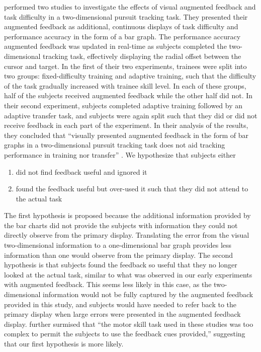 \citeauthor{doi:10.1177/107118137802200127} performed two studies to investigate the effects of visual augmented feedback and task difficulty in a two-dimensional pursuit tracking task.
They presented their augmented feedback as additional, continuous displays of task difficulty and performance accuracy in the form of a bar graph.
The performance accuracy augmented feedback was updated in real-time as subjects completed the two-dimensional tracking task, effectively displaying the radial offset between the cursor and target.
In the first of their two experiments, trainees were split into two groups: fixed-difficulty training and adaptive training, such that the difficulty of the task gradually increased with trainee skill level.
In each of these groups, half of the subjects received augmented feedback while the other half did not.
In their second experiment, subjects completed adaptive training followed by an adaptive transfer task, and subjects were again split such that they did or did not receive feedback in each part of the experiment.
In their analysis of the results, they concluded that ``visually presented augmented feedback in the form of bar graphs in a two-dimensional pursuit tracking task does not aid tracking performance in training nor transfer'' \citep{doi:10.1177/107118137802200127}.
We hypothesize that subjects either
\begin{enumerate}
    \item did not find feedback useful and ignored it
    \item found the feedback useful but over-used it such that they did not attend to the actual task
\end{enumerate}
The first hypothesis is proposed because the additional information provided by the bar charts did not provide the subjects with information they could not directly observe from the primary display.
Translating the error from the visual two-dimensional information to a one-dimensional bar graph provides less information than one would observe from the primary display.
The second hypothesis is that subjects found the feedback so useful that they no longer looked at the actual task, similar to what was observed in our early experiments with augmented feedback.
This seems less likely in this case, as the two-dimensional information would not be fully captured by the augmented feedback provided in this study, and subjects would have needed to refer back to the primary display when large errors were presented in the augmented feedback display.
\citeauthor{doi:10.1177/107118137802200127} further surmised that ``the motor skill task used in these studies was too complex to permit the subjects to use the feedback cues provided,'' suggesting that our first hypothesis is more likely.


